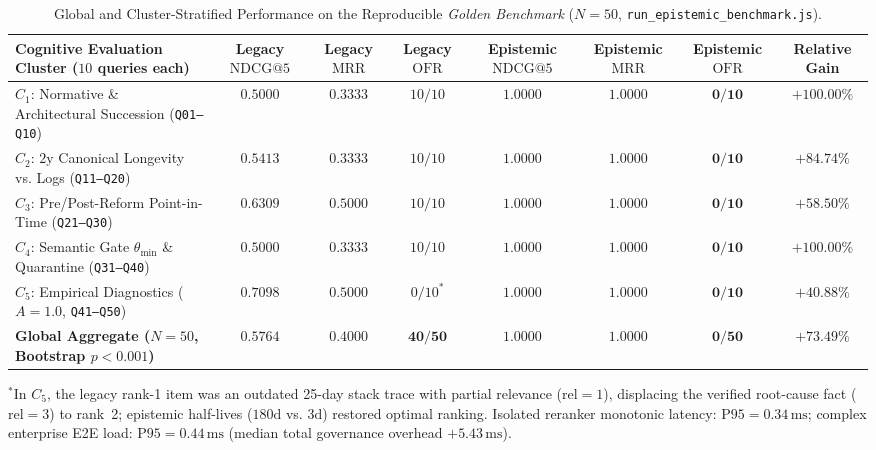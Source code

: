 \documentclass[10pt,twocolumn]{article}
\begin{document}
\begin{table}[t]
\centering
\caption{Global and Cluster-Stratified Performance on the Reproducible \emph{Golden Benchmark} ($N = 50$, \texttt{run\_epistemic\_benchmark.js}).}
\label{tab:results}
\footnotesize
\begin{tabularx}{\textwidth}{@{}X c c c c c c c@{}}
\toprule
\textbf{Cognitive Evaluation Cluster ($10$ queries each)} & \textbf{Legacy $\mathrm{NDCG@5}$} & \textbf{Legacy $\mathrm{MRR}$} & \textbf{Legacy $\mathrm{OFR}$} & \textbf{Epistemic $\mathrm{NDCG@5}$} & \textbf{Epistemic $\mathrm{MRR}$} & \textbf{Epistemic $\mathrm{OFR}$} & \textbf{Relative Gain} \\
\midrule
$C_1$: Normative \& Architectural Succession (\texttt{Q01--Q10}) & $0.5000$ & $0.3333$ & $10/10$ & $\mathbf{1.0000}$ & $\mathbf{1.0000}$ & $\mathbf{0/10}$ & $+100.00\%$ \\
$C_2$: $2\text{y}$ Canonical Longevity vs. Logs (\texttt{Q11--Q20}) & $0.5413$ & $0.3333$ & $10/10$ & $\mathbf{1.0000}$ & $\mathbf{1.0000}$ & $\mathbf{0/10}$ & $+84.74\%$ \\
$C_3$: Pre/Post-Reform Point-in-Time (\texttt{Q21--Q30}) & $0.6309$ & $0.5000$ & $10/10$ & $\mathbf{1.0000}$ & $\mathbf{1.0000}$ & $\mathbf{0/10}$ & $+58.50\%$ \\
$C_4$: Semantic Gate $\theta_{\min}$ \& Quarantine (\texttt{Q31--Q40}) & $0.5000$ & $0.3333$ & $10/10$ & $\mathbf{1.0000}$ & $\mathbf{1.0000}$ & $\mathbf{0/10}$ & $+100.00\%$ \\
$C_5$: Empirical Diagnostics ($A=1.0$, \texttt{Q41--Q50}) & $0.7098$ & $0.5000$ & $0/10^*$ & $\mathbf{1.0000}$ & $\mathbf{1.0000}$ & $\mathbf{0/10}$ & $+40.88\%$ \\
\midrule
\textbf{Global Aggregate ($N = 50$, Bootstrap $p < 0.001$)} & $\mathbf{0.5764}$ & $\mathbf{0.4000}$ & $\mathbf{40/50}$ & $\mathbf{1.0000}$ & $\mathbf{1.0000}$ & $\mathbf{0/50}$ & $\mathbf{+73.49\%}$ \\
\bottomrule
\end{tabularx}
\vspace{0.25em}
\par\raggedright\scriptsize $^*$In $C_5$, the legacy rank-1 item was an outdated 25-day stack trace with partial relevance ($\mathrm{rel}=1$), displacing the verified root-cause fact ($\mathrm{rel}=3$) to rank~2; epistemic half-lives ($180\text{d}$ vs. $3\text{d}$) restored optimal ranking. Isolated reranker monotonic latency: $\mathrm{P95} = 0.34\,\mathrm{ms}$; complex enterprise E2E load: $\mathrm{P95} = 0.44\,\mathrm{ms}$ (median total governance overhead $+5.43\,\mathrm{ms}$).
\end{table}
\end{document}
